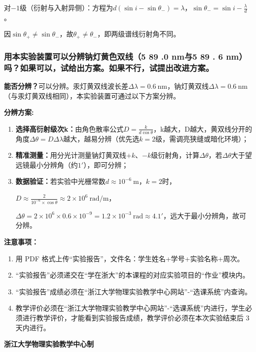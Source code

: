 \documentclass[10pt,a4paper]{ctexart}
\newcommand{\sihao}{\fontsize{14pt}{18pt}\selectfont}
\newcommand{\xiaosi}{\fontsize{12pt}{16pt}\selectfont}
\begin{document}
    对\(-1\)级（衍射与入射异侧）：方程为\(d(\sin i - \sin\theta_-) = \lambda\)，\(\sin\theta_- = \sin i - \frac{\lambda}{d}\)。
    
    因\(\sin\theta_+ \neq \sin\theta_-\)，故\(\theta_+ \neq \theta_-\)，即两级谱线衍射角不同。

    
    \subsubsection*{用本实验装置可以分辨钠灯黄色双线（5 89 .0 nm与5 89 . 6 nm）吗？如果可以，试给出方案。如果不行，试提出改进方案。}

    \textbf{能否分辨？}可以分辨。汞灯黄双线波长差\(\Delta\lambda=0.6\ \text{nm}\)，钠灯黄双线\(\Delta\lambda=0.6\ \text{nm}\)（与汞灯黄双线相同），本实验装置可通过以下方案分辨。
    
    \textbf{分辨方案:}
    \begin{enumerate}
        \item \textbf{选择高衍射级次k：}由角色散率公式\(D=\frac{k}{d\cos\theta}\)，k越大，D越大，黄双线分开的角度\(\Delta\theta=D\Delta\lambda\)越大，越易分辨（优先选\(k=2\)级，需调亮狭缝或暗化环境）；
        \item \textbf{精准测量：}用分光计测量钠灯黄双线\(+k\)、\(-k\)级衍射角，计算\(\Delta\theta\)，若\(\Delta\theta\)大于望远镜最小分辨角（约\(1'\)），即可分辨；
        \item \textbf{数据验证：}若实验中光栅常数\(d\approx10^{-6}\ \text{m}\)，\(k=2\)时，
        
        \(D\approx\frac{2}{10^{-6}\times\cos\theta}\approx2\times10^6\ \text{rad/m}\)，
        
        \(\Delta\theta=2\times10^6\times0.6\times10^{-9}=1.2\times10^{-3}\ \text{rad}\approx4.1'\)，远大于最小分辨角，故可分辨。
    \end{enumerate}

\newpage

\sihao\textbf{注意事项：}
\xiaosi
\begin{enumerate}
    \item  用 PDF 格式上传“实验报告”，文件名：学生姓名+学号+实验名称+周次。
    \item  “实验报告”必须递交在“学在浙大”的本课程的对应实验项目的“作业”模块内。
    \item  “实验报告”成绩必须在“浙江大学物理实验教学中心网站”-“选课系统”内查询。
    \item 教学评价必须在“浙江大学物理实验教学中心网站”-“选课系统”内进行，学生必须进行教学评价，才能看到实验报告成绩，教学评价必须在本次实验结束后 3 天内进行。
\end{enumerate}

\vspace{1cm}
\xiaosi\centering \textbf{浙江大学物理实验教学中心制}
\end{document}
